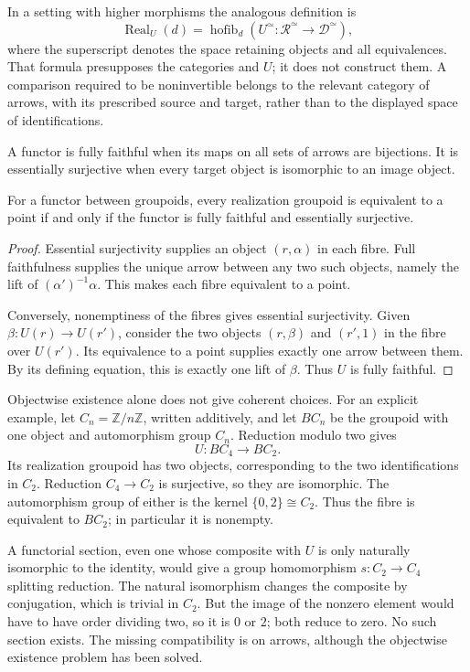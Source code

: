 In a setting with higher morphisms the analogous definition is
\[
 \operatorname{Real}_U(d)
 =\operatorname{hofib}_d
   (U^\simeq:\mathscr R^\simeq\to\mathscr D^\simeq),
\]
where the superscript denotes the space retaining objects and all
equivalences. That formula presupposes the categories and \(U\);
it does not construct them. A comparison required to be noninvertible
belongs to the relevant category of arrows, with its prescribed
source and target, rather than to the displayed space of
identifications.

A functor is fully faithful when its maps on all sets of arrows are
bijections. It is essentially surjective when every target object
is isomorphic to an image object.

\begin{proposition}\label{v4-marked:prop:contractible-fibres}
For a functor between groupoids, every realization groupoid is
equivalent to a point if and only if the functor is fully faithful
and essentially surjective.
\end{proposition}

\begin{proof}
Essential surjectivity supplies an object \((r,\alpha)\) in
each fibre. Full faithfulness supplies the unique arrow between any
two such objects, namely the lift of \((\alpha')^{-1}\alpha\).
This makes each fibre equivalent to a point.

Conversely, nonemptiness of the fibres gives essential surjectivity.
Given \(\beta:U(r)\to U(r')\), consider the two objects
\((r,\beta)\) and \((r',1)\) in the fibre over \(U(r')\).
Its equivalence to a point supplies exactly one arrow between them.
By its defining equation, this is exactly one lift of \(\beta\).
Thus \(U\) is fully faithful.
\end{proof}

Objectwise existence alone does not give coherent choices. For an
explicit example, let \(C_n=\mathbb Z/n\mathbb Z\), written
additively, and let \(BC_n\) be the groupoid with one object and
automorphism group \(C_n\). Reduction modulo two gives
\[
 U:BC_4\longrightarrow BC_2.
\]
Its realization groupoid has two objects, corresponding to the two
identifications in \(C_2\). Reduction \(C_4\to C_2\) is
surjective, so they are isomorphic. The automorphism group of either
is the kernel \(\{0,2\}\cong C_2\). Thus the fibre is
equivalent to \(BC_2\); in particular it is nonempty.

A functorial section, even one whose composite with \(U\) is
only naturally isomorphic to the identity, would give a group
homomorphism \(s:C_2\to C_4\) splitting reduction. The natural
isomorphism changes the composite by conjugation, which is trivial
in \(C_2\). But the image of the nonzero element would have to
have order dividing two, so it is \(0\) or \(2\); both reduce
to zero. No such section exists. The missing compatibility is on
arrows, although the objectwise existence problem has been solved.

